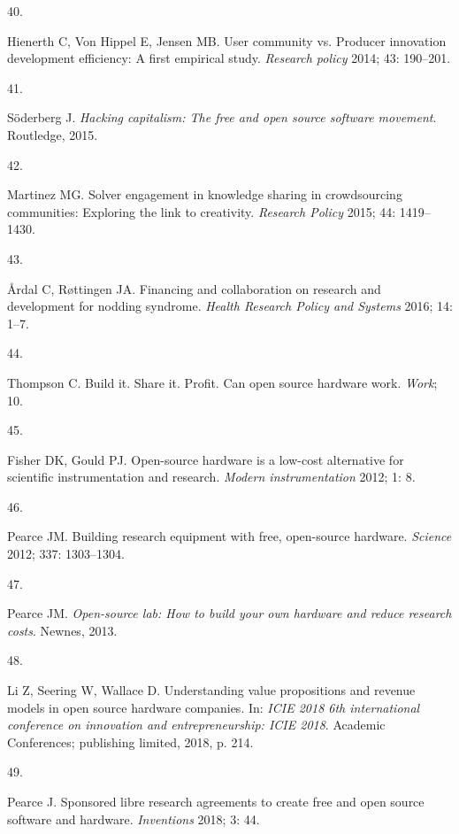 \documentclass[
  11pt,
  a4paperpaper,
  onecolumn]{article}
\newlength{\cslhangindent}
\newlength{\csllabelwidth}
\newlength{\cslentryspacingunit} %
\newenvironment{CSLReferences}[2] %
 {%
  \setlength{\parindent}{0pt}
  \ifodd #1
  \let\oldpar\par
  \def\par{\hangindent=\cslhangindent\oldpar}
  \fi
  \setlength{\parskip}{#2\cslentryspacingunit}
 }%
 {}
\newcommand{\CSLLeftMargin}[1]{\parbox[t]{\csllabelwidth}{#1}}
\newcommand{\CSLRightInline}[1]{\parbox[t]{\linewidth - \csllabelwidth}{#1}\break}
\begin{document}
\begin{CSLReferences}{0}{0}
\leavevmode{}%
\CSLLeftMargin{40. }%
\CSLRightInline{Hienerth C, Von Hippel E, Jensen MB. User community vs.
Producer innovation development efficiency: A first empirical study.
\emph{Research policy} 2014; 43: 190--201.}

\leavevmode{}%
\CSLLeftMargin{41. }%
\CSLRightInline{Söderberg J. \emph{Hacking capitalism: The free and open
source software movement}. Routledge, 2015.}

\leavevmode{}%
\CSLLeftMargin{42. }%
\CSLRightInline{Martinez MG. Solver engagement in knowledge sharing in
crowdsourcing communities: Exploring the link to creativity.
\emph{Research Policy} 2015; 44: 1419--1430.}

\leavevmode{}%
\CSLLeftMargin{43. }%
\CSLRightInline{Årdal C, Røttingen JA. {Financing and collaboration on
research and development for nodding syndrome}. \emph{Health Research
Policy and Systems} 2016; 14: 1--7.}

\leavevmode{}%
\CSLLeftMargin{44. }%
\CSLRightInline{Thompson C. Build it. Share it. Profit. Can open source
hardware work. \emph{Work}; 10.}

\leavevmode{}%
\CSLLeftMargin{45. }%
\CSLRightInline{Fisher DK, Gould PJ. Open-source hardware is a low-cost
alternative for scientific instrumentation and research. \emph{Modern
instrumentation} 2012; 1: 8.}

\leavevmode{}%
\CSLLeftMargin{46. }%
\CSLRightInline{Pearce JM. Building research equipment with free,
open-source hardware. \emph{Science} 2012; 337: 1303--1304.}

\leavevmode{}%
\CSLLeftMargin{47. }%
\CSLRightInline{Pearce JM. \emph{Open-source lab: How to build your own
hardware and reduce research costs}. Newnes, 2013.}

\leavevmode{}%
\CSLLeftMargin{48. }%
\CSLRightInline{Li Z, Seering W, Wallace D. Understanding value
propositions and revenue models in open source hardware companies. In:
\emph{ICIE 2018 6th international conference on innovation and
entrepreneurship: ICIE 2018}. Academic Conferences; publishing limited,
2018, p. 214.}

\leavevmode{}%
\CSLLeftMargin{49. }%
\CSLRightInline{Pearce J. Sponsored libre research agreements to create
free and open source software and hardware. \emph{Inventions} 2018; 3:
44.}


\end{CSLReferences}
\end{document}
